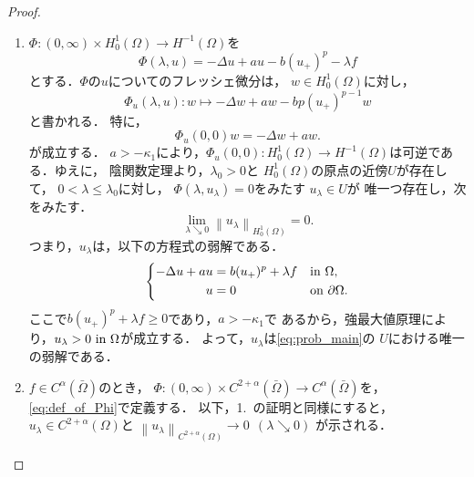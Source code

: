 \begin{proof}
 \begin{enumerate}[1.] \sage
  \item $\Phi \colon (0,\infty) \times H^1_0 (\Omega) \to H^{-1}(\Omega)$を
        \begin{equation}
         \Phi (\lambda, u) = -\Delta u + au - b (u_{+})^p - \lambda f
          \label{eq:def_of_Phi}
        \end{equation}
        とする．$\Phi$の$u$についてのフレッシェ微分は，
        $w \in H^1_0(\Omega)$に対し，
        \begin{equation}
         \Phi_u (\lambda, u) \colon w \mapsto -\Delta w + aw - b
          p(u_+)^{p-1} w
          \label{eq:Phi_dr}
        \end{equation}
        と書かれる．
        特に，
        \[
         \Phi_u (0, 0) w = -\Delta w + aw.
        \]
        が成立する．
        $a > -\kappa_1$により，$\Phi_u(0,0) \colon
        H^1_0(\Omega) \to H^{-1} (\Omega)$は可逆である．ゆえに，
        陰関数定理より，$\lambda_0 > 0$と
        $H_0^1(\Omega)$の原点の近傍$U$が存在して，
        $0 < \lambda \leq \lambda_0$に対し，
        $\Phi(\lambda, u_\lambda) = 0$をみたす
        $u_\lambda \in U$が
        唯一つ存在し，次をみたす．
        \[\lim_{\lambda \searrow 0} \left\| u_\lambda
        \right\|_{H^1_0(\Omega)} 
        = 0. \]
        つまり，$u_\lambda$は，以下の方程式の弱解である．
        \begin{align}
         \left\{
         \begin{aligned}
          -\Delta u + a u &= b (u_+)^p + \lambda f  & &\text{in}~ \Omega,  \\
          u &= 0 & &\text{on}~ \partial\Omega.
         \end{aligned}
         \right. \label{eq:prob_lem_ifthm}
        \end{align}
        ここで$b (u_+)^p + \lambda f \geq 0$であり，$a > -\kappa_1$で
        あるから，強最大値原理により，$u_\lambda > 0 ~\text{in}~
        \Omega$が成立する．
        よって，$u_\lambda$は\ref{eq:prob_main}の
        $U$における唯一の弱解である．
  \item $f \in C^\alpha(\bar{\Omega})$のとき，
        $\Phi \colon (0,\infty) \times C^{2+\alpha} (\bar{\Omega})
        \to C^\alpha(\bar{\Omega})$を，\eqref{eq:def_of_Phi}で定義する．
        以下，1.~の証明と同様にすると，
        $u_\lambda \in
        C^{2+\alpha}(\Omega)$と
        $\left\| u_\lambda
        \right\|_{C^{2+\alpha}(\Omega)} \to 0 \ \ (\lambda \searrow
        0)$
        が示される．\qedhere
 \end{enumerate}
\end{proof}

